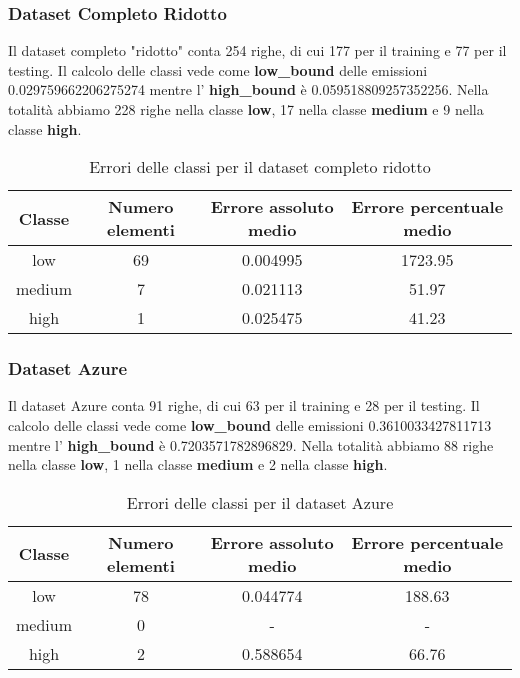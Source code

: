 \subsubsection{Dataset Completo Ridotto}

Il dataset completo "ridotto" conta 254 righe, di cui 177 per il training e 77 per il testing.
Il calcolo delle classi vede come \textbf{low\_bound} delle emissioni 0.029759662206275274 mentre l' \textbf{high\_bound} è 0.059518809257352256.
Nella totalità abbiamo 228 righe nella classe \textbf{low}, 17 nella classe \textbf{medium} e 9 nella classe \textbf{high}.


\begin{table}[H]
    \centering
    \begin{tabular}{|c|c|c|c|}
        \hline
        \textbf{Classe} &  \textbf{Numero elementi} & \textbf{Errore assoluto medio} & \textbf{Errore percentuale medio} \\ \hline
        low             & 69                & 0.004995                   & 1723.95            \\ \hline
        medium          & 7                & 0.021113                  & 51.97            \\ \hline
        high            & 1                & 0.025475                   & 41.23            \\ \hline
    \end{tabular}
    \caption{Errori delle classi per il dataset completo ridotto}
\end{table}


\subsubsection{Dataset Azure}

Il dataset Azure conta 91 righe, di cui 63 per il training e 28 per il testing.
Il calcolo delle classi vede come \textbf{low\_bound} delle emissioni 0.3610033427811713 mentre l' \textbf{high\_bound} è 0.7203571782896829.
Nella totalità abbiamo 88 righe nella classe \textbf{low}, 1 nella classe \textbf{medium} e 2 nella classe \textbf{high}.


\begin{table}[H]
    \centering
    \begin{tabular}{|c|c|c|c|}
        \hline
        \textbf{Classe} &  \textbf{Numero elementi} & \textbf{Errore assoluto medio} & \textbf{Errore percentuale medio} \\ \hline
        low             & 78                & 0.044774                   & 188.63            \\ \hline
        medium          & 0                & -                  & -            \\ \hline
        high            & 2                & 0.588654                   & 66.76            \\ \hline
    \end{tabular}
    \caption{Errori delle classi per il dataset Azure}
\end{table}

